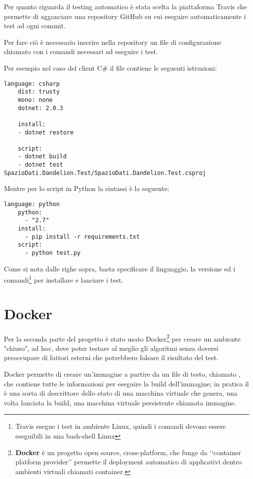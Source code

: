 Per quanto riguarda il testing automatico è stata scelta la piattaforma Travis che permette di agganciare una repository GitHub su cui eseguire automaticamente i test 
ad ogni commit. 

Per fare ciò è necessario inserire nella repository un file di configurazione chiamato  con i comandi necessari ad eseguire i test. 

Per esempio nel caso del client C$\#$ il file  contiene le seguenti istruzioni:

\begin{lstlisting}[style=YmlStyle, caption=File configurazione travis.yml per progetti C$\#$]
    language: csharp
    dist: trusty
    mono: none
    dotnet: 2.0.3

    install:
    - dotnet restore

    script:
    - dotnet build
    - dotnet test SpazioDati.Dandelion.Test/SpazioDati.Dandelion.Test.csproj
\end{lstlisting}

Mentre per lo script in Python la sintassi è la seguente:
\begin{lstlisting}[style=YmlStyle, caption=File configurazione travis.yml per progetti Python]
    language: python
    python: 
      - "2.7"
    install:
      - pip install -r requirements.txt
    script:
      - python test.py
\end{lstlisting}

Come si nota dalle righe sopra, basta specificare il linguaggio, la versione ed i comandi\footnote{
    Travis esegue i test in ambiente Linux, quindi i comandi devono essere eseguibili in una bash-shell Linux
}
per installare e lanciare i test.

\section{Docker}
Per la seconda parte del progetto è stato usato Docker\footnote{
    \textbf{Docker}\cite{docker} è un progetto open source, cross-platform, che funge da \lq\lq container platform provider\rq\rq\; 
    permette il deployment automatico di applicativi dentro ambienti virtuali chiamati container.
} per creare un ambiente "chiuso", ad hoc, dove poter testare al meglio gli algoritmi senza doversi preoccupare di fattori esterni che potrebbero falsare 
il risultato del test. 

Docker permette di creare un'immagine a partire da un file di testo, chiamato , che contiene tutte le informazioni per eseguire la build dell'immagine; 
in pratica il  è una sorta di descrittore dello stato di una macchina virtuale che genera, una volta lanciata la build, una macchina virtuale persistente chiamata immagine. 

